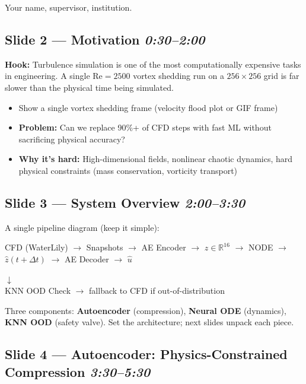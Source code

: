 \documentclass[11pt, a4paper]{article}
\begin{document}
Your name, supervisor, institution.

\subsection*{Slide 2 --- Motivation \hfill \normalfont\textit{0:30--2:00}}

\textbf{Hook:} Turbulence simulation is one of the most computationally expensive tasks in
engineering. A single Re$=2500$ vortex shedding run on a $256\times256$ grid is far
slower than the physical time being simulated.

\begin{itemize}
  \item Show a single vortex shedding frame (velocity flood plot or GIF frame)
  \item \textbf{Problem:} Can we replace 90\%+ of CFD steps with fast ML without
        sacrificing physical accuracy?
  \item \textbf{Why it's hard:} High-dimensional fields, nonlinear chaotic dynamics,
        hard physical constraints (mass conservation, vorticity transport)
\end{itemize}

\subsection*{Slide 3 --- System Overview \hfill \normalfont\textit{2:00--3:30}}

A single pipeline diagram (keep it simple):

\begin{center}
CFD (WaterLily) $\to$ Snapshots $\to$ AE Encoder $\to$
$z\in\mathbb{R}^{16}$ $\to$ NODE $\to$ $\hat{z}(t+\Delta t)$
$\to$ AE Decoder $\to$ $\hat{u}$
\end{center}
\begin{center}
$\downarrow$\\
KNN OOD Check $\to$ fallback to CFD if out-of-distribution
\end{center}

Three components: \textbf{Autoencoder} (compression), \textbf{Neural ODE} (dynamics),
\textbf{KNN OOD} (safety valve). Set the architecture; next slides unpack each piece.

\subsection*{Slide 4 --- Autoencoder: Physics-Constrained Compression \hfill \normalfont\textit{3:30--5:30}}
\end{document}
